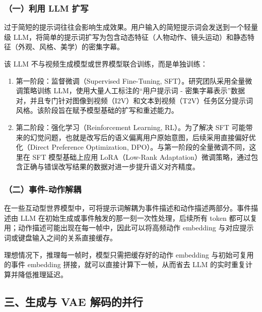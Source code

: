 \hypertarget{ux4e00ux5229ux7528-llm-ux6269ux5199}{%
\subsubsection{（一）利用 LLM 扩写}\label{ux4e00ux5229ux7528-llm-ux6269ux5199}}

过于简短的提示词往往会影响生成效果。用户输入的简短提示词会发送到一个轻量级 LLM，将简单的提示词扩写为包含动态特征（人物动作、镜头运动）和静态特征（外观、风格、美学）的密集字幕。

该 LLM 不与视频生成模型或世界模型联合训练，而是单独训练：

\begin{enumerate}
\def\labelenumi{\arabic{enumi}.}
\tightlist
\item
  第一阶段：监督微调（Supervised Fine-Tuning, SFT）。研究团队采用全量微调策略训练 LLM，使用大量人工标注的``用户提示词 - 密集字幕表示''数据对，并且专门针对图像到视频（I2V）和文本到视频（T2V）任务区分提示词风格。该阶段旨在赋予模型基础的扩写和重述能力。
\item
  第二阶段：强化学习（Reinforcement Learning, RL）。为了解决 SFT 可能带来的幻觉问题，也就是改写后的语义偏离用户原始意图，后续采用直接偏好优化（Direct Preference Optimization, DPO）。与第一阶段的全量微调不同，这里在 SFT 模型基础上应用 LoRA（Low-Rank Adaptation）微调策略，通过包含正确与错误改写结果的数据对进一步提升语义对齐精度。
\end{enumerate}

\hypertarget{ux4e8cux4e8bux4ef6-ux52a8ux4f5cux89e3ux8026}{%
\subsubsection{（二）事件-动作解耦}\label{ux4e8cux4e8bux4ef6-ux52a8ux4f5cux89e3ux8026}}

在一些互动型世界模型中，可将提示词解耦为事件描述和动作描述两部分。事件描述由 LLM 在初始生成或事件触发的那一刻一次性处理，后续所有 token 都可以复用；动作描述可能出现在每一帧中，因此可以将高频动作 embedding 与对应提示词或键盘输入之间的关系直接缓存。

理想情况下，推理每一帧时，模型只需把缓存好的动作 embedding 与初始可复用的事件 embedding 拼接，就可以直接计算下一帧，从而省去 LLM 的实时重复计算并降低推理延迟。

\hypertarget{ux4e09ux751fux6210ux4e0e-vae-ux89e3ux7801ux7684ux5e76ux884c}{%
\subsection{三、生成与 VAE 解码的并行}\label{ux4e09ux751fux6210ux4e0e-vae-ux89e3ux7801ux7684ux5e76ux884c}}

